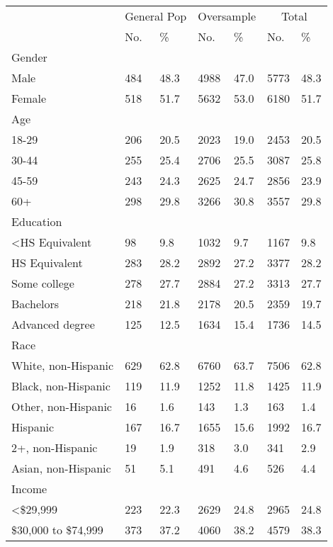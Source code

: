 \captionsetup[table]{labelformat=empty,skip=1pt}
\begin{longtable}{lllllll}
\toprule
& \multicolumn{2}{c}{General Pop} & \multicolumn{2}{c}{Oversample} & \multicolumn{2}{c}{Total} \\ 
 \cmidrule(lr){2-3}\cmidrule(lr){4-5}\cmidrule(lr){6-7}
 & No. & \% & No. & \% & No. & \% \\ 
\midrule
\multicolumn{1}{l}{Gender} \\ 
\midrule
Male & 484 & 48.3 & 4988 & 47.0 & 5773 & 48.3 \\ 
Female & 518 & 51.7 & 5632 & 53.0 & 6180 & 51.7 \\ 
\midrule
\multicolumn{1}{l}{Age} \\ 
\midrule
18-29 & 206 & 20.5 & 2023 & 19.0 & 2453 & 20.5 \\ 
30-44 & 255 & 25.4 & 2706 & 25.5 & 3087 & 25.8 \\ 
45-59 & 243 & 24.3 & 2625 & 24.7 & 2856 & 23.9 \\ 
60+ & 298 & 29.8 & 3266 & 30.8 & 3557 & 29.8 \\ 
\midrule
\multicolumn{1}{l}{Education} \\ 
\midrule
<HS Equivalent & 98 & 9.8 & 1032 & 9.7 & 1167 & 9.8 \\ 
HS Equivalent & 283 & 28.2 & 2892 & 27.2 & 3377 & 28.2 \\ 
Some college & 278 & 27.7 & 2884 & 27.2 & 3313 & 27.7 \\ 
Bachelors & 218 & 21.8 & 2178 & 20.5 & 2359 & 19.7 \\ 
Advanced degree & 125 & 12.5 & 1634 & 15.4 & 1736 & 14.5 \\ 
\midrule
\multicolumn{1}{l}{Race} \\ 
\midrule
White, non-Hispanic & 629 & 62.8 & 6760 & 63.7 & 7506 & 62.8 \\ 
Black, non-Hispanic & 119 & 11.9 & 1252 & 11.8 & 1425 & 11.9 \\ 
Other, non-Hispanic & 16 & 1.6 & 143 & 1.3 & 163 & 1.4 \\ 
Hispanic & 167 & 16.7 & 1655 & 15.6 & 1992 & 16.7 \\ 
2+, non-Hispanic & 19 & 1.9 & 318 & 3.0 & 341 & 2.9 \\ 
Asian, non-Hispanic & 51 & 5.1 & 491 & 4.6 & 526 & 4.4 \\ 
\midrule
\multicolumn{1}{l}{Income} \\ 
\midrule
<\$29,999 & 223 & 22.3 & 2629 & 24.8 & 2965 & 24.8 \\ 
\$30,000 to \$74,999 & 373 & 37.2 & 4060 & 38.2 & 4579 & 38.3 \\ 

\end{longtable}
